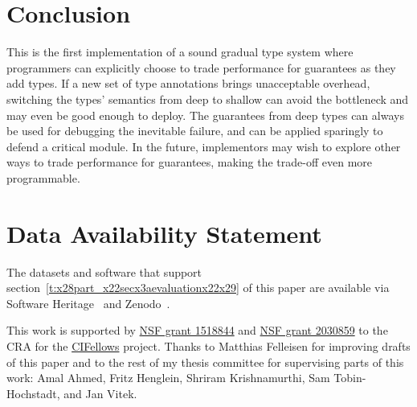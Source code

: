 \documentclass[screen=true, natbib=false, 10pt, sigplan]{acmart}
\newcommand{\sectionNewpage}{}
\newcommand{\postDoc}{}
\let\SOriginalthesubsection\thesubsection
\newcommand{\Ssection}[2]{\section[#1]{#2}\let\thesubsection\SOriginalthesubsection}
\begin{document}
\sectionNewpage

\Ssection{Conclusion}{Conclusion}\label{t:x28part_x22secx3aconclusionx22x29}

This is the first implementation of a sound gradual type system where
programmers can explicitly choose to trade performance for guarantees
as they add types.
If a new set of type annotations brings unacceptable overhead,
switching the types{'} semantics from deep to shallow
can avoid the bottleneck and may even be good enough to deploy.
The guarantees from deep types can always be used for debugging
the inevitable failure, and can be applied sparingly to defend
a critical module.
In the future, implementors may wish to explore other ways to trade
performance for guarantees, making the trade{-}off even more programmable.

\section*{Data Availability Statement}

The datasets and software that support
section~\ref{t:x28part_x22secx3aevaluationx22x29} of this paper
are available via Software Heritage~\cite{gpldi2022sh}
and Zenodo~\cite{gpldi2022z}.


\begin{acks}

This work is supported by
\href{https://www.nsf.gov/awardsearch/showAward?AWD_ID=1518844}{NSF grant 1518844}
and
\href{https://www.nsf.gov/awardsearch/showAward?AWD_ID=2030859}{NSF grant 2030859}
to the CRA for the \href{https://cifellows2020.org}{CIFellows} project.
Thanks to Matthias Felleisen for improving drafts of this paper and to
the rest of my thesis committee for supervising parts of this work:
Amal Ahmed,
Fritz Henglein,
Shriram Krishnamurthi,
Sam Tobin{-}Hochstadt,
and
Jan Vitek.

\end{acks}

\relax{\begingroup
\setlength{\emergencystretch}{8em}
\balance
\printbibliography
\endgroup}

\postDoc
\end{document}
